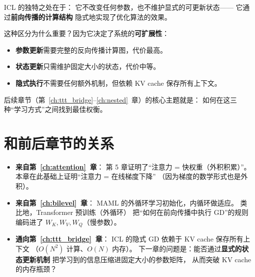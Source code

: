 ICL 的独特之处在于：
它不改变任何参数，也不维护显式的可更新状态——
它通过\textbf{前向传播的计算结构}
隐式地实现了优化算法的效果。

这种区分为什么重要？因为它决定了系统的\textbf{可扩展性}：
\begin{itemize}
  \item \textbf{参数更新}需要完整的反向传播计算图，代价最高。
  \item \textbf{状态更新}只需维护固定大小的状态，代价中等。
  \item \textbf{隐式执行}不需要任何额外机制，但依赖 KV cache 保存所有上下文。
\end{itemize}

后续章节（第~\ref{ch:ttt_bridge}--\ref{ch:nested}~章）的核心主题就是：
如何在这三种``学习方式''之间找到最佳权衡。

\section{和前后章节的关系}
\label{sec:icl_bridges}

\begin{itemize}
  \item \textbf{来自第~\ref{ch:attention}~章}：
    第 5 章证明了``注意力 = 快权重（外积积累）''。
    本章在此基础上证明``注意力 = 在线梯度下降''
    （因为梯度的数学形式也是外积）。

  \item \textbf{来自第~\ref{ch:bilevel}~章}：
    MAML 的外循环学习初始化，内循环做适应。
    类比地，Transformer 预训练（外循环）
    把``如何在前向传播中执行 GD''的规则
    编码进了 $W_K, W_V, W_Q$（慢参数）。

  \item \textbf{通向第~\ref{ch:ttt_bridge}~章}：
    ICL 的隐式 GD 依赖于 KV cache 保存所有上下文
    （$O(N^2)$ 计算、$O(N)$ 内存）。
    下一章的问题是：能否通过\textbf{显式的状态更新机制}
    把学习到的信息压缩进固定大小的参数矩阵，
    从而突破 KV cache 的内存瓶颈？
\end{itemize}

